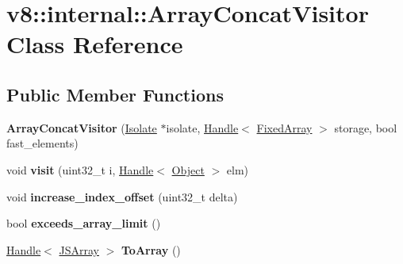 \hypertarget{classv8_1_1internal_1_1_array_concat_visitor}{}\section{v8\+:\+:internal\+:\+:Array\+Concat\+Visitor Class Reference}
\label{classv8_1_1internal_1_1_array_concat_visitor}
\subsection*{Public Member Functions}
\begin{DoxyCompactItemize}
\item 
\hypertarget{classv8_1_1internal_1_1_array_concat_visitor_a6c0a40ee619a009eb147d5b64e3e67e9}{}{\bfseries Array\+Concat\+Visitor} (\hyperlink{classv8_1_1internal_1_1_isolate}{Isolate} $\ast$isolate, \hyperlink{classv8_1_1internal_1_1_handle}{Handle}$<$ \hyperlink{classv8_1_1internal_1_1_fixed_array}{Fixed\+Array} $>$ storage, bool fast\+\_\+elements)\label{classv8_1_1internal_1_1_array_concat_visitor_a6c0a40ee619a009eb147d5b64e3e67e9}

\item 
\hypertarget{classv8_1_1internal_1_1_array_concat_visitor_a40760600be9819cccc809177bd5b093e}{}void {\bfseries visit} (uint32\+\_\+t i, \hyperlink{classv8_1_1internal_1_1_handle}{Handle}$<$ \hyperlink{classv8_1_1internal_1_1_object}{Object} $>$ elm)\label{classv8_1_1internal_1_1_array_concat_visitor_a40760600be9819cccc809177bd5b093e}

\item 
\hypertarget{classv8_1_1internal_1_1_array_concat_visitor_a6e0c776e6fca2519d21308a5304759c7}{}void {\bfseries increase\+\_\+index\+\_\+offset} (uint32\+\_\+t delta)\label{classv8_1_1internal_1_1_array_concat_visitor_a6e0c776e6fca2519d21308a5304759c7}

\item 
\hypertarget{classv8_1_1internal_1_1_array_concat_visitor_a49bd86c6d367951c0505dda656c2c702}{}bool {\bfseries exceeds\+\_\+array\+\_\+limit} ()\label{classv8_1_1internal_1_1_array_concat_visitor_a49bd86c6d367951c0505dda656c2c702}

\item 
\hypertarget{classv8_1_1internal_1_1_array_concat_visitor_a71132108509a36a9a8f9f7530ef063ee}{}\hyperlink{classv8_1_1internal_1_1_handle}{Handle}$<$ \hyperlink{classv8_1_1internal_1_1_j_s_array}{J\+S\+Array} $>$ {\bfseries To\+Array} ()\label{classv8_1_1internal_1_1_array_concat_visitor_a71132108509a36a9a8f9f7530ef063ee}

\end{DoxyCompactItemize}


